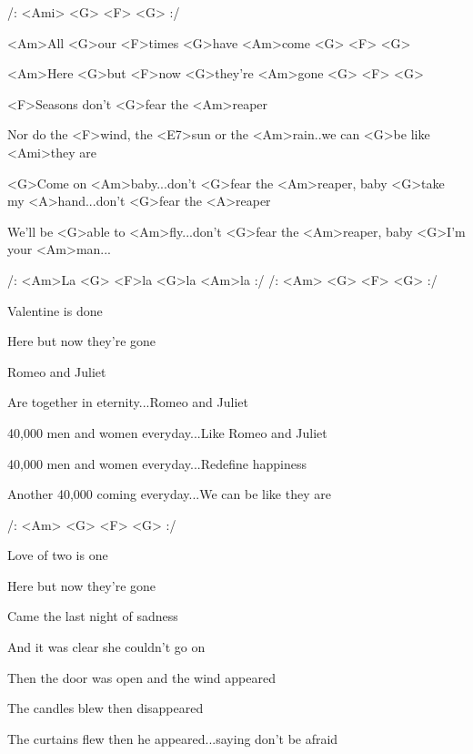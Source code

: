 

/: <Ami> <G> <F> <G> :/



\zs 

<Am>All <G>our <F>times <G>have <Am>come <G> <F> <G>

<Am>Here <G>but <F>now <G>they're <Am>gone <G> <F> <G>

<F>Seasons don't <G>fear the <Am>reaper

Nor do the <F>wind, the <E7>sun or the <Am>rain..we can <G>be like <Ami>they are
\ks
 
\zr
<G>Come on <Am>baby...don't <G>fear the <Am>reaper, 
baby <G>take my <A>hand...don't <G>fear the <A>reaper

We'll be <G>able to <Am>fly...don't <G>fear the <Am>reaper,
baby <G>I'm your <Am>man...
 
/: <Am>La <G>  <F>la <G>la <Am>la :/
/: <Am> <G> <F> <G>  :/
\kr 


\zs 
Valentine is done

Here but now they're gone

Romeo and Juliet

Are together in eternity...Romeo and Juliet

40,000 men and women everyday...Like Romeo and Juliet

40,000 men and women everyday...Redefine happiness

Another 40,000 coming everyday...We can be like they are
\ks

\zr 
\kr
 
/: <Am> <G> <F> <G> :/
 
\zs

Love of two is one

Here but now they're gone

Came the last night of sadness

And it was clear she couldn't go on

Then the door was open and the wind appeared

The candles blew then disappeared

The curtains flew then he appeared...saying don't be afraid
\ks

\zr 
\kr


\kp

